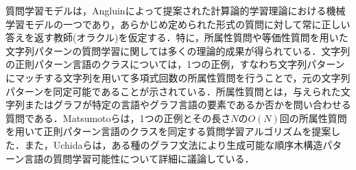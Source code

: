 
質問学習モデルは，Angluin\cite{angluin-ml1988}によって提案された計算論的学習理論における機械学習モデルの一つであり，あらかじめ定められた形式の質問に対して常に正しい答えを返す教師(オラクル)を仮定する．特に，所属性質問や等価性質問を用いた文字列パターンの質問学習に関しては多くの理論的成果が得られている．文字列の正則パターン言語のクラスについては，1つの正例，すなわち文字列パターンにマッチする文字列を用いて多項式回数の所属性質問を行うことで，元の文字列パターンを同定可能であることが示されている\cite{angluin-jcss1980,angluin-ic1987}．所属性質問とは，与えられた文字列またはグラフが特定の言語やグラフ言語の要素であるか否かを問い合わせる質問である．Matsumotoら\cite{matsumoto-ieice2020}は，1つの正例とその長さ$N$の$O(N)$回の所属性質問を用いて正則パターン言語のクラスを同定する質問学習アルゴリズムを提案した．また，Uchidaら\cite{uchida2014,uchida-ieice2019}は，ある種のグラフ文法により生成可能な順序木構造パターン言語の質問学習可能性について詳細に議論している．


